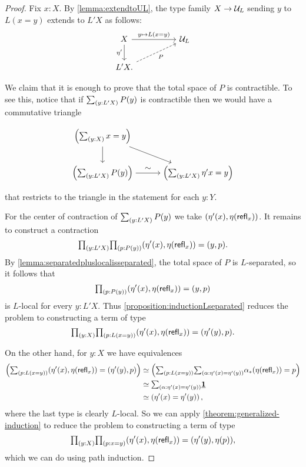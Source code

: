 \begin{proof}
    Fix $x : X$.
    By \cref{lemma:extendtoUL}, the type family $X \to \mathcal{U}_L$ sending
    $y$ to $L(x = y)$ extends to $L'X$
    as follows:
\begin{equation*}
\begin{tikzcd}[column sep=huge]
X \arrow[r,"y\mapsto L(x=y)"] \arrow[d,swap,"{\eta'}"] & \UU_L \\
L'X . \arrow[ur,dashed,swap,"P"]
\end{tikzcd}
\end{equation*}

We claim that it is enough to prove that the total space of $P$ is contractible.
To see this, notice that if $\sm{y:L'X}P(y)$ is contractible then we would have a
commutative triangle
    \[
    \begin{tikzpicture}
      \matrix (m) [matrix of math nodes,row sep=2em,column sep=3em,minimum width=2em]
        { \left(\sm{y:X} x=y\right) & \\
        \left(\sm{y:L'X} P(y)\right) & \left(\sm{y:L'X}\eta'x = y\right) \\};
      \path[->]
        (m-1-1) edge node [left] {} (m-2-1)
                edge node [above] {} (m-2-2)
        (m-2-1) edge node [above] {$\sim$} (m-2-2)
        ;
    \end{tikzpicture}
    \]
that restricts to the triangle in the statement for each $y : Y$.

For the center of contraction of $\sm{y:L'X}P(y)$ we take $(\eta'(x),\eta(\mathsf{refl}_{x}))$.
It remains to construct a contraction
\begin{equation*}
\prd{y:L'X}{p:P(y)}(\eta'(x),\eta(\refl{x}))=(y,p).
\end{equation*}
By \cref{lemma:separatedpluslocalisseparated}, the total space of $P$ is $L$-separated, 
so it follows that 
\[
  \prd{p:P(y)} (\eta'(x),\eta(\refl{x}))=(y,p)
\]
is $L$-local for every $y:L'X$. 
Thus \cref{proposition:inductionLseparated} reduces the problem to
constructing a term of type
\begin{equation*}
\prd{y:X}{p:L(x=y)}(\eta'(x),\eta(\refl{x}))=(\eta'(y),p).
\end{equation*}

On the other hand, for $y : X$ we have equivalences
\begin{align*}
    \left(\sm{p:L(x=y)}(\eta'(x),\eta(\refl{x}))=(\eta'(y),p)\right)
 & \eqvsym \left(\sm{p:L(x=y)}{\alpha:\eta'(x)=\eta'(y)} \trans{\alpha}{\eta(\refl{x})} = p \right) \\
 & \eqvsym \sm{\alpha:\eta'(x) = \eta'(y)} \unit \\
 & \eqvsym \left( \eta'(x) = \eta'(y) \right),
\end{align*}
where the last type is clearly $L$-local.
So we can apply \cref{theorem:generalized-induction} to reduce the problem to
constructing a term of type
\begin{equation*}
    \prd{y:X}{p:x=y}(\eta'(x),\eta(\refl{x}))=(\eta'(y),\eta(p)) ,
\end{equation*}
which we can do using path induction.
\end{proof}

